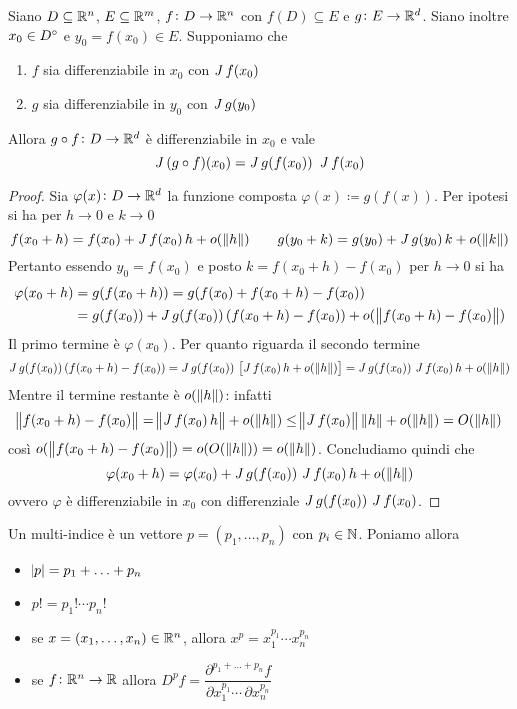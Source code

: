 \begin{thm}
	Siano $ D \subseteq \mathbb{R}^n $, $ E \subseteq \mathbb{R}^m $, $ f \colon D \to \mathbb{R}^n $ con $ f(D) \subseteq E $ e $ g \colon E \to \mathbb{R}^d $. Siano inoltre $ x_0 \in {D}^{\circ} $ e $ y_0 = f(x_0) \in E $. Supponiamo che 
	\begin{enumerate}[label = (\roman*)]
		\item $ f $ sia differenziabile in $ x_0 $ con $ \operatorname{\mathit{J}}{f}(x_0) $
		\item $ g $ sia differenziabile in $ y_0 $ con $ \operatorname{\mathit{J}}{g}(y_0) $
	\end{enumerate}
	Allora $ g \circ f \colon D \to \mathbb{R}^d $ è differenziabile in $ x_0 $ e vale 
	\begin{equation}
		\operatorname{\mathit{J}}{(g \circ f)}(x_0) = \operatorname{\mathit{J}}{g}(f(x_0)) \ \operatorname{\mathit{J}}{f}(x_0)
	\end{equation}
\end{thm}
%
\begin{proof}
	Sia $ \varphi(x) \colon D \to \mathbb{R}^d $ la funzione composta $ \varphi(x) \coloneqq g(f(x)) $. Per ipotesi si ha per $ h \to 0 $ e $ k \to 0 $
	\[
		f(x_0 + h) = f(x_0) + \operatorname{\mathit{J}}{f}(x_0) \, h + o(\,\norm{h}) \qquad g(y_0 + k) = g(y_0) + \operatorname{\mathit{J}}{g}(y_0) \, k + o(\,\norm{k}) 
	\]
	Pertanto essendo $ y_0 = f(x_0) $ e posto $ k = f(x_0 + h) - f(x_0) $ per $ h \to 0 $ si ha 
	\begin{align*}
		\varphi(x_0 + h) & = g(f(x_0 + h)) = g(f(x_0) + f(x_0 + h) - f(x_0)) \\
		& = g(f(x_0)) + \operatorname{\mathit{J}}{g}(f(x_0)) \, (f(x_0 + h) - f(x_0)) + o(\,\norm{f(x_0 + h) - f(x_0)}) 
	\end{align*}
	Il primo termine è $ \varphi(x_0) $. Per quanto riguarda il secondo termine 
	\[
		\operatorname{\mathit{J}}{g}(f(x_0)) \, (f(x_0 + h) - f(x_0)) = \operatorname{\mathit{J}}{g}(f(x_0)) \, \left[\operatorname{\mathit{J}}{f}(x_0) \, h + o(\,\norm{h})\right] = \operatorname{\mathit{J}}{g}(f(x_0)) \, \operatorname{\mathit{J}}{f}(x_0) \, h + o(\,\norm{h})
	\]
	Mentre il termine restante è $ o(\,\norm{h}) $: infatti
	\[
		\norm{f(x_0 + h) - f(x_0)} = \norm{\operatorname{\mathit{J}}{f}(x_0) \, h} + o(\,\norm{h}) \leq \norm{\operatorname{\mathit{J}}{f}(x_0)} \, \norm{h} + o(\,\norm{h}) = O(\,\norm{h})
	\]
	così $ o(\,\norm{f(x_0 + h) - f(x_0)}) = o(O(\,\norm{h})) = o(\,\norm{h}) $. Concludiamo quindi che
	\[
		\varphi(x_0 + h) = \varphi(x_0) + \operatorname{\mathit{J}}{g}(f(x_0)) \, \operatorname{\mathit{J}}{f}(x_0) \, h + o(\,\norm{h})
	\]
	ovvero $ \varphi $ è differenziabile in $ x_0 $ con differenziale $ \operatorname{\mathit{J}}{g}(f(x_0)) \, \operatorname{\mathit{J}}{f}(x_0) $. 
\end{proof}

\begin{definition}
	Un multi-indice è un vettore $ p = (p_1, \ldots, p_n) $ con $ p_i \in \mathbb{N} $. Poniamo allora 
	\begin{itemize}
		\item $ \abs{p} = p_1 + \ldots + p_n $
		\item $ p! = p_1! \cdots p_n! $
		\item se $ x = (x_1, \ldots, x_n) \in \mathbb{R}^n $, allora $ x^p = x_1^{p_1} \cdots x_n^{p_n} $
		\item se $ f \colon \mathbb{R}^n \to \mathbb{R} $ allora $ D^p{f} = \dfrac{\partial^{p_1 + \ldots + p_n}{f}}{\partial{x_1^{p_1}} \cdots \, \partial{x_n^{p_n}}} $
	\end{itemize}
\end{definition}

